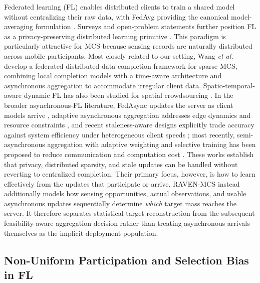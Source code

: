 \documentclass[letterpaper,journal]{IEEEtran}
\begin{document}
Federated learning (FL) enables distributed clients to train a shared model
without centralizing their raw data, with FedAvg providing the canonical
model-averaging formulation \cite{mcmahan2017communication,yang2019federated}.
Surveys and open-problem statements further position FL as a privacy-preserving
distributed learning primitive
\cite{kairouz2021advances,li2020federated}.  This paradigm is
particularly attractive for MCS because sensing records are naturally
distributed across mobile participants.  Most closely related to our setting,
Wang \emph{et al.}~\cite{wang2026federated} develop a federated distributed
data-completion framework for sparse MCS, combining local completion models
with a time-aware architecture and asynchronous aggregation to accommodate
irregular client data.  Spatio-temporal-aware dynamic FL has also been studied
for spatial crowdsourcing \cite{li2026stdfl}.  In the broader asynchronous-FL
literature, FedAsync updates the server as client models arrive
\cite{xie2019asynchronous}, adaptive asynchronous aggregation addresses edge
dynamics and resource constraints
\cite{liu2023adaptive,sun2024staleness}, and recent staleness-aware designs
explicitly trade accuracy against system efficiency under heterogeneous client
speeds \cite{sun2024staleness}; most recently, semi-asynchronous aggregation
with adaptive weighting and selective training has been proposed to reduce
communication and computation cost \cite{islam2025seafl}.  These
works establish that privacy, distributed sparsity, and stale updates can be
handled without reverting to centralized completion.  Their primary focus,
however, is how to learn effectively from the updates that participate or
arrive.  RAVEN-MCS instead additionally models how sensing opportunities,
actual observations, and usable asynchronous updates sequentially determine
\emph{which} target mass reaches the server.  It therefore separates
statistical target reconstruction from the subsequent feasibility-aware
aggregation decision rather than treating asynchronous arrivals themselves as
the implicit deployment population.

\subsection{Non-Uniform Participation and Selection Bias in FL}
\end{document}
